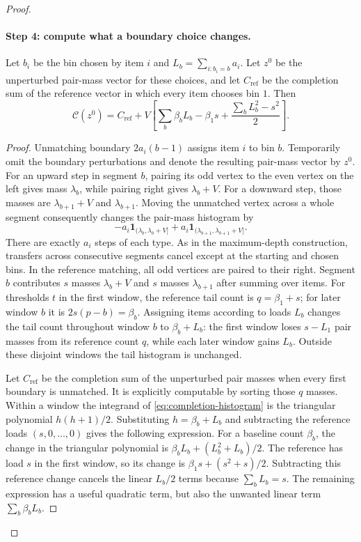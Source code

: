\begin{proof}
\paragraph{Step 4: compute what a boundary choice changes.}
\begin{claim}
Let $b_i$ be the bin chosen by item $i$ and
$L_b=\sum_{i:b_i=b}a_i$. Let $z^0$ be the unperturbed pair-mass
vector for these choices, and let $C_{\mathrm{ref}}$ be the
completion sum of the reference vector in which every item chooses
bin $1$. Then
\begin{equation}\label{eq:expected-bin-identity}
 \mathcal C(z^0)=C_{\mathrm{ref}}+
 V\left[\sum_b\beta_bL_b-\beta_1s+
             \frac{\sum_bL_b^2-s^2}{2}\right].
\end{equation}
\end{claim}
\begin{proof}
Unmatching boundary $2a_i(b-1)$ assigns item $i$ to bin $b$.
Temporarily omit the boundary perturbations and denote the
resulting pair-mass vector by $z^0$.
For an upward step in segment $b$, pairing its odd vertex
to the even vertex on the left gives mass $\lambda_b$,
while pairing right gives $\lambda_b+V$.
For a downward step, those masses are
$\lambda_{b+1}+V$ and $\lambda_{b+1}$.
Moving the unmatched vertex across a whole segment consequently
changes the pair-mass histogram by
\[
 -a_i\mathbf1_{(\lambda_b,\lambda_b+V]}+
  a_i\mathbf1_{(\lambda_{b+1},\lambda_{b+1}+V]}.
\]
There are exactly $a_i$ steps of each type.
As in the maximum-depth construction, transfers across consecutive
segments cancel except at the starting and chosen bins.
In the reference matching, all odd vertices are paired to their
right. Segment $b$ contributes $s$ masses $\lambda_b+V$ and
$s$ masses $\lambda_{b+1}$ after summing over items.
For thresholds $t$ in the first window, the reference tail count
is $q=\beta_1+s$; for later window $b$ it is
$2s(p-b)=\beta_b$. Assigning items according to loads $L_b$
changes the tail count throughout window $b$ to
$\beta_b+L_b$: the first window loses $s-L_1$ pair masses from its
reference count $q$, while each later window gains $L_b$.
Outside these disjoint windows the tail histogram is unchanged.

Let $C_{\mathrm{ref}}$ be the completion sum of the unperturbed
pair masses when every first boundary is unmatched. It is explicitly
computable by sorting those $q$ masses.
Within a window the integrand of
\eqref{eq:completion-histogram} is the triangular polynomial
$h(h+1)/2$. Substituting $h=\beta_b+L_b$ and subtracting the
reference loads $(s,0,\ldots,0)$ gives the following expression.
For a baseline count $\beta_b$, the change in the triangular
polynomial is
$\beta_bL_b+(L_b^2+L_b)/2$. The reference has load $s$ in the first
window, so its change is
$\beta_1s+(s^2+s)/2$. Subtracting this reference change cancels the
linear $L_b/2$ terms because $\sum_bL_b=s$.
The remaining expression has a useful quadratic term, but also
the unwanted linear term $\sum_b\beta_bL_b$.
\end{proof}


\end{proof}
